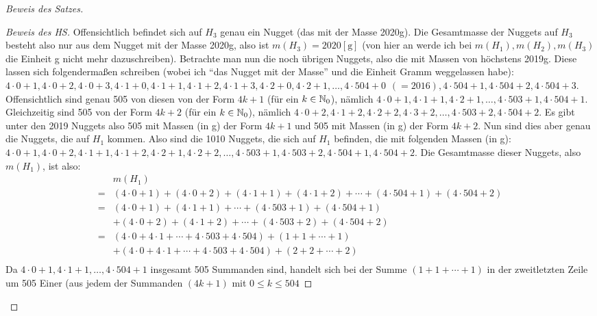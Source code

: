 \begin{proof}[Beweis des Satzes]
\begin{proof}[Beweis des HS]
        Offensichtlich befindet sich auf $H_3$ genau ein Nugget (das mit der Masse 2020g). Die Gesamtmasse der 
        Nuggets auf $H_3$ besteht also nur aus dem Nugget mit der Masse 2020g, also ist $m(H_3) = 2020 [\text{g}]$ 
        (von hier an werde ich bei $m(H_1), m(H_2), m(H_3)$ die Einheit g nicht mehr dazuschreiben). Betrachte man 
        nun die noch übrigen Nuggets, also die mit Massen von höchstens 2019g. Diese lassen sich folgendermaßen 
        schreiben (wobei ich "`das Nugget mit der Masse"' und die Einheit Gramm weggelassen habe): 
        $4\cdot 0+1, 4\cdot 0+2, 4\cdot 0+3, 4\cdot 1+0, 4\cdot 1+1, 4\cdot 1+2, 4\cdot 1+3, 4\cdot 2+0, 4\cdot 2+1, 
        \ldots, 4\cdot 504+0\hspace{5pt} (=2016), 4\cdot 504+1, 4\cdot 504+2, 4\cdot 504+3$. Offensichtlich sind 
        genau 505 von diesen von der Form $4k +1$ (für ein $k \in \mathbb{N}_0$), nämlich $4\cdot 0+1, 4\cdot 1+1, 4\cdot 2+1, 
        \ldots, 4\cdot 503+1, 4\cdot 504+1$. Gleichzeitig sind 505 von der Form $4k+2$ (für ein $k\in\mathbb{N}_0$), nämlich 
        $4\cdot 0+2, 4\cdot 1+2, 4\cdot 2+2, 4\cdot 3+2, \ldots, 4\cdot 503+2, 4\cdot 504+2$. Es gibt unter den 2019 
        Nuggets also 505 mit Massen (in g) der Form $4k+1$ und 505 mit Massen (in g) der Form $4k+2$. Nun sind dies 
        aber genau die Nuggets, die auf $H_1$ kommen.
        Also sind die 1010 Nuggets, die sich auf $H_1$ befinden, die mit folgenden Massen (in g): $4\cdot 0+1, 
        4\cdot 0+2, 4\cdot 1+1, 4\cdot 1+2, 4\cdot 2+1, 4\cdot 2+2, \ldots, 4\cdot 503+1, 4\cdot 503+2, 4\cdot 504+1, 
        4\cdot 504+2$. Die Gesamtmasse dieser Nuggets, also $m(H_1)$, ist also:
        \begin{align*}
            &m(H_1)\\
            =&(4\cdot 0+1)+(4\cdot 0+2)+(4\cdot 1+1)+(4\cdot 1+2)+\cdots+(4\cdot 504+1)+(4\cdot 504+2)\\
            = &(4\cdot 0+1)+(4\cdot1+1)+\cdots+(4\cdot 503+1)+(4\cdot 504+1)\\
            &+(4\cdot 0+2)+(4\cdot1+2)+\cdots+(4\cdot 503+2)+(4\cdot 504+2)\\
            = &(4\cdot0+4\cdot1+\cdots+4\cdot503+4\cdot504)+(1+1+\cdots+1)\\
            &+(4\cdot0+4\cdot1+\cdots+4\cdot503+4\cdot504)+(2+2+\cdots+2)\\
        \end{align*}
        Da $4\cdot0+1, 4\cdot1+1, \ldots, 4\cdot504+1$ insgesamt 505 Summanden sind, handelt sich bei der Summe
        $(1+1+\cdots+1)$ in der zweitletzten Zeile um 505 Einer (aus jedem der Summanden $(4k+1)$ mit $0\leq k\leq 504$ 

\end{proof}
\end{proof}
